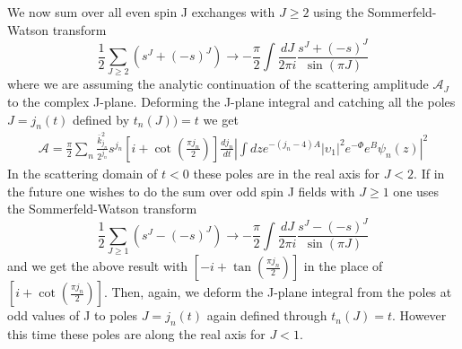 \documentclass[a4paper,12pt]{article}
\begin{document}
We now sum over all even spin J exchanges with $J \geqslant 2$ using the Sommerfeld-Watson transform
\begin{equation}
\frac{1}{2} \sum_{J \geqslant 2} \left( s^J + {\left(-s\right)}^J \right) \rightarrow - \frac{\pi}{2} \int \frac{dJ}{2 \pi i} \frac{s^J + {\left(-s\right)}^J}{\sin\left(\pi J\right)}
\end{equation}
where we are assuming the analytic continuation of the scattering amplitude $\mathcal{A}_J$ to the complex J-plane. Deforming the J-plane integral and catching all the poles $J = j_n\left(t\right)$ defined by $t_n\left(J\right) ) = t$ we get
\begin{align}
\mathcal{A} = \frac{\pi}{2} \sum_n \frac{\bar{k}_{j_n}^2}{2^{j_n}} s^{j_n} \left[i + \cot \left( \frac{\pi j_n}{2} \right) \right] \frac{d j_n}{dt} {\left| \int dz e^{-\left(j_n - 4\right) A} {|\upsilon_1|}^2 e^{-\Phi} e^B \psi_n \left(z \right) \right|}^2
\end{align}
In the scattering domain of $t < 0$ these poles are in the real axis for $J < 2$. If in the future one wishes to do the sum over odd spin J fields with $J \geqslant 1$ one
uses the Sommerfeld-Watson transform
\begin{equation}
\frac{1}{2} \sum_{J \geqslant 1} \left( s^J - {\left(-s\right)}^J \right) \rightarrow - \frac{\pi}{2} \int \frac{dJ}{2 \pi i} \frac{s^J - {\left(-s\right)}^J}{\sin\left(\pi J\right)}
\end{equation}
and we get the above result with $ \left[-i + \tan \left( \frac{\pi j_n}{2} \right) \right]$ in the place of $\left[i + \cot \left( \frac{\pi j_n}{2} \right) \right]$. Then, again, we deform the J-plane integral from the poles at odd values of J to poles $J = j_n\left(t\right)$ again defined through $t_n\left(J\right) = t$. However this time these poles are along the real axis for $J < 1$.

\end{document}
